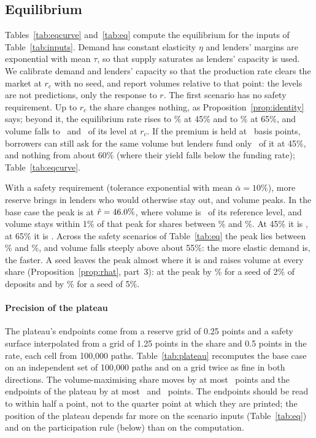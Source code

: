 \documentclass[preprint,11pt,authoryear]{elsarticle}
\theoremstyle{definition}
\begin{document}
\subsection{Equilibrium}

Tables~\ref{tab:eqcurve} and~\ref{tab:eq} compute the equilibrium for the inputs of Table~\ref{tab:inputs}. Demand has constant elasticity $\eta$ and
lenders' margins are exponential with mean $\tau$, so that supply saturates as lenders' capacity is used. We
calibrate demand and lenders' capacity so that the production rate clears the market at $r_c$ with no seed, and report
volumes relative to that point: the levels are not predictions, only the response to $r$. The first
scenario has no safety requirement. Up to $r_c$ the share changes nothing, as Proposition~\ref{prop:identity} says; beyond it,
the equilibrium rate rises to \AFortyFiveYield\% at 45\% and to \ASixtyFiveYield\% at 65\%, and volume falls to
\VFortyFiveYield\ and \VSixtyFiveYield\ of its level at $r_c$. If the premium is held at \PremBps\ basis points, borrowers can
still ask for the same volume but lenders fund only \VFixedFortyFiveYield\ of it at 45\%, and nothing from about 60\% (where their
yield falls below the funding rate); Table~\ref{tab:eqcurve}.

With a safety requirement (tolerance exponential with mean $\bar\alpha=10\%$), more reserve brings in lenders who
would otherwise stay out, and volume peaks. In the base case the peak is at $\hat r=46.0\%$, where volume is \VMaxBase\ of its
reference level, and volume stays within 1\% of that peak for shares between \LoNinetyNine\% and \HiNinetyNine\%. At 45\% it is
\VFortyFiveBase, at 65\% it is \VSixtyFiveBase. Across the safety scenarios of Table~\ref{tab:eq} the peak lies between \RHatMin\% and
\RHatMax\%, and volume falls steeply above about 55\%: the more elastic demand is, the faster. A seed leaves the peak
almost where it is and raises volume at every share (Proposition~\ref{prop:rhat}, part~3): at the peak by \SeedGainTwo\% for a seed of 2\% of deposits and by \SeedGainFive\% for a seed of 5\%.

\paragraph{Precision of the plateau} The plateau's endpoints come from a reserve grid of 0.25 points and a safety
surface interpolated from a grid of 1.25 points in the share and 0.5 points in the rate, each cell from 100,000 paths.
Table~\ref{tab:plateau} recomputes the base case on an independent set of 100,000 paths and on a grid twice as fine in
both directions. The volume-maximising share moves by at most \RHatSpread\ points and the endpoints of the plateau by at
most \PlateauLoSpread\ and \PlateauHiSpread\ points. The endpoints should be read to within half a point, not to the
quarter point at which they are printed; the position of the plateau depends far more on the scenario inputs
(Table~\ref{tab:eq}) and on the participation rule (below) than on the computation.
\end{document}
